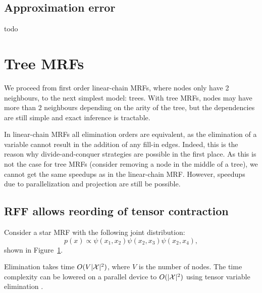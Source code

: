 \documentclass{article}
\begin{document}
\subsection{Approximation error}
todo

\section{Tree MRFs}
We proceed from first order linear-chain MRFs, where nodes only have 2 neighbours,
to the next simplest model: trees.
With tree MRFs, nodes may have more than 2 neighbours depending on the arity of the tree,
but the dependencies are still simple and exact inference is tractable.

In linear-chain MRFs all elimination orders are equivalent, as the elimination 
of a variable cannot result in the addition of any fill-in edges.
Indeed, this is the reason why divide-and-conquer strategies are possible
in the first place.
As this is not the case for tree MRFs (consider removing a node in the middle of a tree),
we cannot get the same speedups as in the linear-chain MRF.
However, speedups due to parallelization and projection are still be possible.

\subsection{RFF allows reording of tensor contraction}
Consider a star MRF with the following joint distribution:
\begin{equation}
p(x) \propto \psi(x_1, x_2) \psi(x_2, x_3) \psi(x_2, x_4),
\end{equation}
shown in Figure~\ref{fig:star-mrf}.
\begin{figure}[htb!]
\centering
{}
\caption{
\label{fig:star-mrf}
}
\end{figure}
Elimination takes time $O(V|\mathcal{X}|^2)$, where $V$ is the number of nodes.
The time complexity can be lowered on a parallel device to $O(|\mathcal{X}|^2)$
using tensor variable elimination \citep{obermeyer2019tve}.
\end{document}
